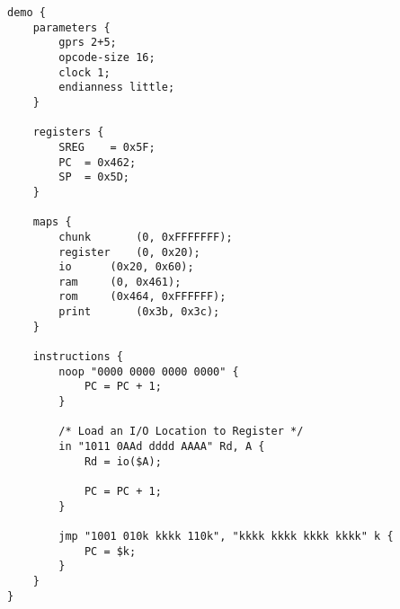 
\begin{block}{\large {}\vphantom{Example Code}}

\tiny {  
\lstset{
numbers=left,                   %
numberstyle=\footnotesize,      %
stepnumber=1,
xleftmargin=25pt
}
\begin{lstlisting}
demo {
	parameters {
		gprs 2+5;
		opcode-size 16;
		clock 1;
		endianness little;
	}

	registers {
		SREG	= 0x5F;
		PC	= 0x462;
		SP	= 0x5D;
	}

	maps {
		chunk		(0, 0xFFFFFFF);
		register	(0, 0x20);
		io		(0x20, 0x60);
		ram		(0, 0x461);
		rom		(0x464, 0xFFFFFF);
		print		(0x3b, 0x3c);
	}

	instructions {
		noop "0000 0000 0000 0000" {
			PC = PC + 1;
		}

		/* Load an I/O Location to Register */
		in "1011 0AAd dddd AAAA" Rd, A {
			Rd = io($A);

			PC = PC + 1;
		}

		jmp "1001 010k kkkk 110k", "kkkk kkkk kkkk kkkk" k {
			PC = $k;
		}
	}
}
  
\end{lstlisting}

}

\end{block}
